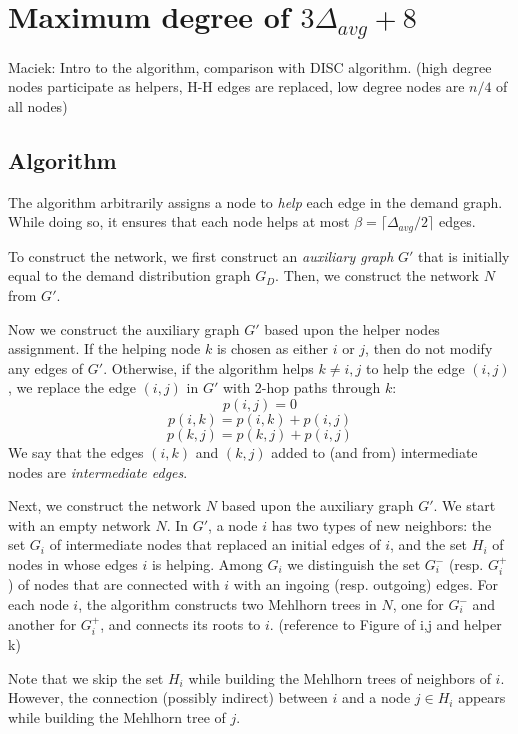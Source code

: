 \documentclass{article}
\begin{document}
\section{Maximum degree of $3\Delta_{avg} + 8$}

Maciek: Intro to the algorithm, comparison with DISC algorithm.
(high degree nodes participate as helpers, H-H edges are replaced, low degree nodes are $n/4$ of all nodes)

\subsection{Algorithm}


The algorithm arbitrarily assigns a node to \emph{help} each edge in the demand graph.
While doing so, it ensures that each node helps at most $\beta = \lceil\Delta_{avg}/2\rceil$ edges.


To construct the network, we first construct an \emph{auxiliary graph} $G'$ that is initially equal to the demand distribution graph $G_D$.
Then, we construct the network $N$ from $G'$.

Now we construct the auxiliary graph $G'$ based upon the helper nodes assignment.
If the helping node $k$ is chosen as either $i$ or $j$, then do not modify any edges of $G'$.
Otherwise, if the algorithm helps $k \neq i,j$ to help the edge $(i, j)$, we replace the edge $(i, j)$ in $G'$ with 
2-hop paths through $k$:
$$ p(i,j) = 0$$
$$ p(i,k) = p(i,k) + p(i,j)$$
$$ p(k,j) = p(k,j) + p(i,j)$$
We say that the edges $(i,k)$ and $(k,j)$ added to (and from) intermediate nodes are \emph{intermediate edges}.

Next, we construct the network $N$ based upon the auxiliary graph $G'$.
We start with an empty network $N$.
In $G'$, a node $i$ has two types of new neighbors: 
the set $G_i$ of intermediate nodes that replaced an initial edges of $i$, and the set $H_i$ of nodes in whose edges $i$ is helping.
Among $G_i$ we distinguish the set $G_i^-$ (resp. $G_i^+$) of nodes that are connected with $i$ with an ingoing (resp. outgoing) edges.
For each node $i$, the algorithm constructs two Mehlhorn trees in $N$, one for $G_i^-$ and another for $G_i^+$, and connects its roots to $i$.
(reference to Figure of i,j and helper k)

Note that we skip the set $H_i$ while building the Mehlhorn trees of neighbors of $i$.
However, the connection (possibly indirect) between $i$ and a node $j \in H_i$ appears while building the Mehlhorn tree of $j$.
\end{document}
